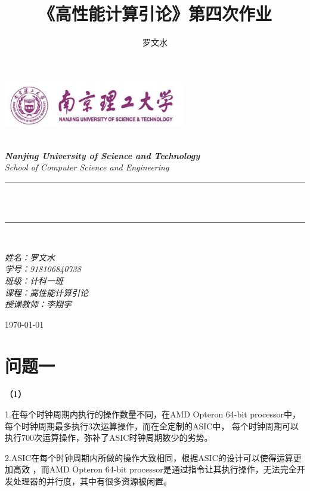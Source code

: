 \documentclass[12pt]{article}
\title{《高性能计算引论》第四次作业}
\author{\textup{罗文水}}
\begin{document}
	\begin{titlepage}
		\newcommand{\HRule}{\rule{\linewidth}{0.5mm}}
		\begin{center}
			\includegraphics[width=8cm]{../HPC_P1/title}			
		\end{center}
		
		\center 
		\quad\\[1.5cm]
		\textsl{\Large \textbf{Nanjing University of Science and Technology} }\\[0.5cm] 
		\textsl{\large School of Computer Science and Engineering}\\[0.5cm] 
		\makeatletter
		\HRule \\[0.4cm]
		{ \huge \bfseries \@title}\\[0.25cm] 
		\HRule \\[1.5cm]
	\begin{minipage}{0.42\textwidth}
		\begin{flushleft}
			
			\Large{\emph{姓名：罗文水}}
			\\
			\Large{\emph{学号：918106840738}}
			\\
			\Large{\emph{班级：计科一班}}
			\\
			\Large{\emph{课程：高性能计算引论}}
			\\
			\Large{\emph{授课教师：李翔宇}}
			\\
		\end{flushleft}
	\end{minipage}
		\vspace{7em} 
		
		{\large \today}\\[2cm] 
		\vfill 
	\end{titlepage}
	
	\newpage
\section{问题一}
\textbf{（1）}

1.在每个时钟周期内执行的操作数量不同，在AMD Opteron 64-bit processor中，每个时钟周期最多执行3次运算操作，而在全定制的ASIC中，
每个时钟周期可以执行700次运算操作，弥补了ASIC时钟周期数少的劣势。

2.ASIC在每个时钟周期内所做的操作大致相同，根据ASIC的设计可以使得运算更加高效
，而AMD Opteron 64-bit processor是通过指令让其执行操作，无法完全开发处理器的并行度，其中有很多资源被闲置。
\end{document}
